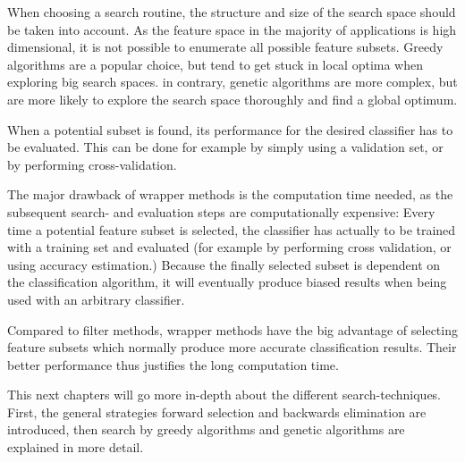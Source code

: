When choosing a search routine, the structure and size of the search space should be taken into account. As the feature space in the majority of 
applications is high dimensional, it is not possible to enumerate all possible feature subsets. Greedy algorithms are a popular choice,
but tend to get stuck in local optima when exploring big search spaces. in contrary, genetic algorithms are more complex, but are more likely
to explore the search space thoroughly and find a global optimum.

When a potential subset is found, its performance for the desired classifier has to be evaluated. 
This can be done for example by simply using a validation set, or by performing cross-validation.

The major drawback of wrapper methods is the computation time needed, as the subsequent search- and evaluation steps are computationally expensive: 
Every time a potential feature subset is selected, the classifier has actually to be trained with a training set and evaluated (for example by performing
cross validation, or using accuracy estimation.\cite{Kohavi:97}) Because the finally selected subset is dependent on the classification algorithm, 
it will eventually produce biased results when being used with an arbitrary classifier. 

Compared to filter methods, wrapper methods have the big advantage of selecting feature subsets which normally produce more accurate classification results.
Their better performance thus justifies the long computation time.

This next chapters will go more in-depth about the different search-techniques. First, the general strategies forward selection and backwards elimination 
are introduced, then search by greedy algorithms and genetic algorithms are explained in more detail.





